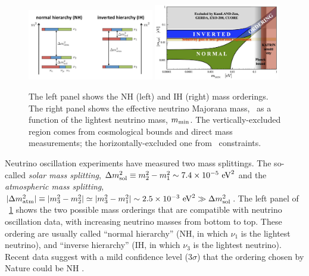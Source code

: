 \begin{figure}[h!]
\centering
\includegraphics[width=0.49\textwidth]{img2/mass-hierarchy-jgu-mainz-web.jpg} \hfill
\includegraphics[width=0.49\textwidth]{img2/APPECbetabetameff.jpg}
\caption{\small The left panel shows the NH (left) and IH (right) mass orderings. 
The right panel \cite{Giuliani:2019uno} shows the effective neutrino Majorana mass, \mbb\, as a function of the lightest neutrino mass, $m_{\rm min}$.
The vertically-excluded region comes from cosmological bounds and direct mass measurements; the horizontally-excluded one from \bbonu\ constraints.} \label{fig:numass_ordering}
\end{figure}

\indent

Neutrino oscillation experiments have measured two mass splittings. The so-called \emph{solar mass splitting}, $\Delta m^2_{ \rm sol}\equiv m^2_2-m^2_1\sim 7.4 \times
10^{-5}\ {\rm eV}^2$ and the
\emph{atmospheric mass splitting}, $|\Delta m^2_{\rm
atm}|\equiv |m^2_3-m^2_2|\simeq|m^2_3-m^2_1| \sim 2.5 \times 10^{-3}\ {\rm
eV}^2\gg \Delta m^2_{\rm sol}$. The left panel of \Fig~\ref{fig:numass_ordering} shows the two possible mass orderings that are compatible with neutrino oscillation data, with increasing neutrino masses from bottom to top. These ordering are usually called ``normal hierarchy'' (NH, in which $\nu_1$ is the lightest neutrino), and
``inverse hierarchy'' (IH, in which $\nu_3$ is the lightest neutrino). Recent data suggest with a mild confidence level (3$\sigma$) that the ordering chosen by Nature could be NH \cite{deSalas:2018bym}.

